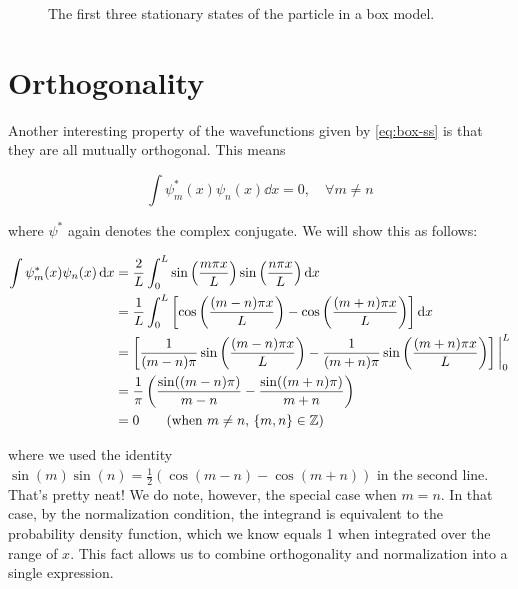 \begin{figure}[!h]
	\centering
	\caption{The first three stationary states of the particle in a box model.}
	\label{fig:ss-box}
\end{figure}


\section{Orthogonality}

Another interesting property of the wavefunctions given by \autoref{eq:box-ss} is that they are all mutually orthogonal. 
This means 

\begin{equation*}
	\int \psi_m^*(x) \psi_n(x) \dd{x} = 0, \quad \forall m \neq n
\end{equation*}

\noindent where $\psi^*$ again denotes the complex conjugate. 
We will show this as follows:

\begin{align*}
	\int \psi_m^*(x) \psi_n(x) \dd{x} &= \frac{2}{L} \int_0^L \sin\left(\frac{m\pi x}{L}\right) \sin\left(\frac{n\pi x}{L} \right) \dd{x} \\
	&= \frac{1}{L} \int_{0}^{L} \left[ \cos\left(\frac{(m-n)\pi x}{L}\right) - \cos\left(\frac{(m+n)\pi x}{L}\right) \right] \dd{x} \\
	&= \left[ \frac{1}{(m-n)\pi} \sin \left(\frac{(m-n)\pi x}{L}\right) - \frac{1}{(m+n)\pi} \sin\left( \frac{(m+n)\pi x}{L} \right)\right] \bigg|_0^L \\
	&= \frac{1}{\pi} \left( \frac{\sin((m-n)\pi)}{m-n} - \frac{\sin((m+n)\pi)}{m+n}\right) \\
	&= 0 \tag{when $m\neq n$, $\{m,n\} \in \mathbb{Z}$}
\end{align*}

\noindent where we used the identity $\sin(m)\sin(n) = \frac{1}{2}(\cos(m - n) - \cos(m + n))$ in the second line. 
That's pretty neat! 
We do note, however, the special case when $m=n$. 
In that case, by the normalization condition, the integrand is equivalent to the probability density function, which we know equals 1 when integrated over the range of $x$. 
This fact allows us to combine orthogonality and normalization into a single expression.

